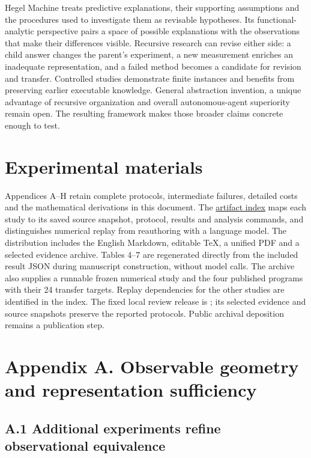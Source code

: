 \documentclass[twoside,11pt]{article}
\begin{document}
Hegel Machine treats predictive explanations, their supporting assumptions and the procedures used to investigate them as revisable hypotheses. Its functional-analytic perspective pairs a space of possible explanations with the observations that make their differences visible. Recursive research can revise either side: a child answer changes the parent's experiment, a new measurement enriches an inadequate representation, and a failed method becomes a candidate for revision and transfer. Controlled studies demonstrate finite instances and benefits from preserving earlier executable knowledge. General abstraction invention, a unique advantage of recursive organization and overall autonomous-agent superiority remain open. The resulting framework makes those broader claims concrete enough to test.


\section*{Experimental materials}

Appendices A–H retain complete protocols, intermediate failures, detailed costs and the mathematical derivations in this document. The \hyperlink{artifact-1}{artifact index} maps each study to its saved source snapshot, protocol, results and analysis commands, and distinguishes numerical replay from reauthoring with a language model. The distribution includes the English Markdown, editable TeX, a unified PDF and a selected evidence archive. Tables 4–7 are regenerated directly from the included result JSON during manuscript construction, without model calls. The archive also supplies a runnable frozen numerical study and the four published programs with their 24 transfer targets. Replay dependencies for the other studies are identified in the index. The fixed local review release is ; its selected evidence and source snapshots preserve the reported protocols. Public archival deposition remains a publication step.


\clearpage

\section*{Appendix A. Observable geometry and representation sufficiency}

\subsection*{A.1 Additional experiments refine observational equivalence}
\end{document}
